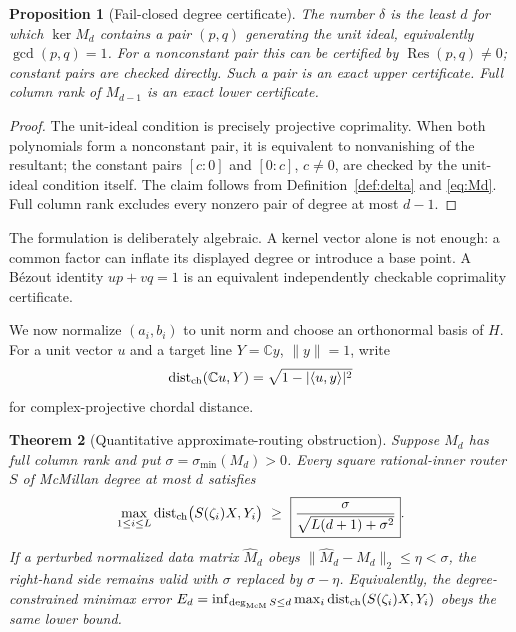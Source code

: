 \documentclass[11pt]{article}
\newtheorem{theorem}{Theorem}[section]
\newtheorem{proposition}[theorem]{Proposition}
\theoremstyle{definition}\newtheorem{definition}[theorem]{Definition}\newtheorem{example}[theorem]{Example}
\theoremstyle{remark}\newtheorem{remark}[theorem]{Remark}\newtheorem{limitation}[theorem]{Limitation}
\newcommand{\C}{\mathbb C}\newcommand{\D}{\mathbb D}\newcommand{\T}{\mathbb T}
\newcommand{\Res}{\operatorname{Res}}\newcommand{\mcdeg}{\deg_{\mathrm{McM}}}
\newcommand{\norm}[1]{\lVert#1\rVert}\newcommand{\dd}{\,\mathrm d}
\begin{document}
\begin{proposition}[Fail-closed degree certificate]\label{prop:certificate}
The number $\delta$ is the least $d$ for which $\ker M_d$ contains a pair
$(p,q)$ generating the unit ideal, equivalently $\gcd(p,q)=1$.  For a
nonconstant pair this can be certified by $\Res(p,q)\ne0$; constant pairs are
checked directly.  Such a pair is an exact upper certificate.
Full column rank of $M_{d-1}$ is an exact lower certificate.
\end{proposition}

\begin{proof}
The unit-ideal condition is precisely projective coprimality.  When both
polynomials form a nonconstant pair, it is equivalent to nonvanishing of the
resultant; the constant pairs $[c:0]$ and $[0:c]$, $c\ne0$, are checked by the
unit-ideal condition itself.  The claim follows from Definition~\ref{def:delta} and
\eqref{eq:Md}.  Full column rank excludes every nonzero pair of degree at most
$d-1$.
\end{proof}

The formulation is deliberately algebraic.  A kernel vector alone is not
enough: a common factor can inflate its displayed degree or introduce a base
point.  A B\'ezout identity $up+vq=1$ is an equivalent independently checkable
coprimality certificate.

We now normalize $(a_i,b_i)$ to unit norm and choose an orthonormal basis of
$H$.  For a unit vector $u$ and a target line $Y=\C y$, $\norm y=1$, write
\[
 \operatorname{dist}_{\rm ch}(\C u,Y)
 =\sqrt{1-|\langle u,y\rangle|^2}
\]
for complex-projective chordal distance.

\begin{theorem}[Quantitative approximate-routing obstruction]\label{thm:approx}
Suppose $M_d$ has full column rank and put
$\sigma=\sigma_{\min}(M_d)>0$.  Every square rational-inner router $S$ of
McMillan degree at most $d$ satisfies
\begin{equation}\label{eq:approx}
 \max_{1\le i\le L}\operatorname{dist}_{\rm ch}
       \bigl(S(\zeta_i)X,Y_i\bigr)
 \ \ge\ \boxed{\frac{\sigma}{\sqrt{L(d+1)+\sigma^2}}}.
\end{equation}
If a perturbed normalized data matrix $\widehat M_d$ obeys
$\norm{\widehat M_d-M_d}_2\le\eta<\sigma$, the right-hand side remains valid
with $\sigma$ replaced by $\sigma-\eta$.
Equivalently, the degree-constrained minimax error
$E_d=\inf_{\mcdeg S\le d}\max_i\operatorname{dist}_{\rm ch}(S(\zeta_i)X,Y_i)$
obeys the same lower bound.
\end{theorem}
\end{document}
